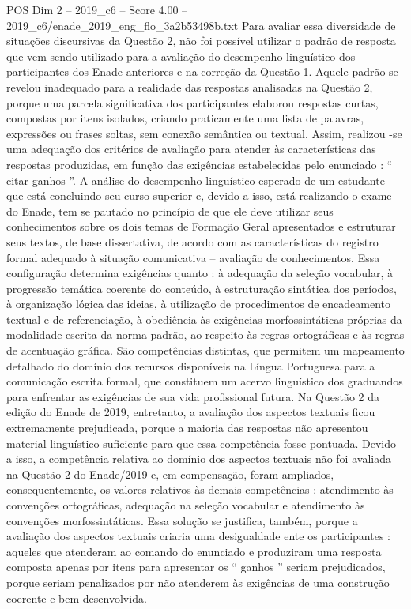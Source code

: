 \begin{textsample}{POS Dim 2 – 2019\_c6 – Score 4.00 – 2019\_c6/enade\_2019\_eng\_flo\_3a2b53498b.txt}
Para avaliar essa diversidade de situações discursivas da Questão 2, não foi possível utilizar o padrão de resposta que vem sendo utilizado para a avaliação do desempenho linguístico dos participantes dos Enade anteriores e na correção da Questão 1.
Aquele padrão se revelou inadequado para a realidade das respostas analisadas na Questão 2, porque uma parcela significativa dos participantes elaborou respostas curtas, compostas por itens isolados, criando praticamente uma lista de palavras, expressões ou frases soltas, sem conexão semântica ou textual.
Assim, realizou -se uma adequação dos critérios de avaliação para atender às características das respostas produzidas, em função das exigências estabelecidas pelo enunciado : “ citar ganhos ”.
A análise do desempenho linguístico esperado de um estudante que está concluindo seu curso superior e, devido a isso, está realizando o exame do Enade, tem se pautado no princípio de que ele deve utilizar seus conhecimentos sobre os dois temas de Formação Geral apresentados e estruturar seus textos, de base dissertativa, de acordo com as características do registro formal adequado à situação comunicativa – avaliação de conhecimentos.
Essa configuração determina exigências quanto : à adequação da seleção vocabular, à progressão temática coerente do conteúdo, à estruturação sintática dos períodos, à organização lógica das ideias, à utilização de procedimentos de encadeamento textual e de referenciação, à obediência às exigências morfossintáticas próprias da modalidade escrita da norma-padrão, ao respeito às regras ortográficas e às regras de acentuação gráfica.
São competências distintas, que permitem um mapeamento detalhado do domínio dos recursos disponíveis na Língua Portuguesa para a comunicação escrita formal, que constituem um acervo linguístico dos graduandos para enfrentar as exigências de sua vida profissional futura.
Na Questão 2 da edição do Enade de 2019, entretanto, a avaliação dos aspectos textuais ficou extremamente prejudicada, porque a maioria das respostas não apresentou material linguístico suficiente para que essa competência fosse pontuada.
Devido a isso, a competência relativa ao domínio dos aspectos textuais não foi avaliada na Questão 2 do Enade/2019 e, em compensação, foram ampliados, consequentemente, os valores relativos às demais competências : atendimento às convenções ortográficas, adequação na seleção vocabular e atendimento às convenções morfossintáticas.
Essa solução se justifica, também, porque a avaliação dos aspectos textuais criaria uma desigualdade ente os participantes : aqueles que atenderam ao comando do enunciado e produziram uma resposta composta apenas por itens para apresentar os “ ganhos ” seriam prejudicados, porque seriam penalizados por não atenderem às exigências de uma construção coerente e bem desenvolvida.

\end{textsample}
